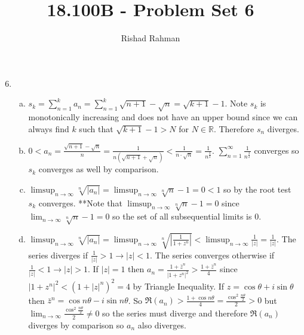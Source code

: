 \documentclass{article}
\begin{document}
\setlength{\abovedisplayskip}{0pt}
\setlength{\belowdisplayskip}{0pt}
\setlength{\abovedisplayshortskip}{0pt}
\setlength{\belowdisplayshortskip}{0pt}
\title{18.100B - Problem Set 6}
\author{Rishad Rahman}
\date{}
\maketitle
\begin{enumerate}
\setcounter{enumi}{5}
\item
\begin{enumerate}[(a)]
\item $s_k=\displaystyle\sum_{n=1}^{k} a_n=\displaystyle\sum_{n=1}^{k} \sqrt{n+1}-\sqrt{n}=\sqrt{k+1}-1$. Note $s_k$ is monotonically increasing and does not have an upper bound since we can always find $k$ such that $\sqrt{k+1}-1 > N$ for $N\in\mathbb{R}$. Therefore $s_n$ diverges.
\item $\displaystyle 0 < a_n=\frac{\sqrt{n+1}-\sqrt{n}}{n}=\frac{1}{n(\sqrt{n+1}+\sqrt{n})} < \frac{1}{n\cdot\sqrt{n}} = \frac{1}{n^{\frac{3}{2}}}$. $\displaystyle\sum_{n=1}^{\infty} \frac{1}{n^{\frac{3}{2}}}$ converges so $s_k$ converges as well by comparison.
\item $\displaystyle\limsup_{n\rightarrow\infty} \sqrt[n]{|a_n|} = \displaystyle\limsup_{n\rightarrow\infty} \sqrt[n]{n} - 1 = 0 < 1$ so by the root test $s_k$ converges. **Note that $\displaystyle\limsup_{n\rightarrow\infty} \sqrt[n]{n} - 1 = 0$ since $\displaystyle\lim_{n\rightarrow\infty} \sqrt[n]{n} - 1 = 0$ so the set of all subsequential limits is ${0}$. 
\item $\displaystyle\limsup_{n\rightarrow\infty} \sqrt[n]{|a_n|}=\displaystyle\limsup_{n\rightarrow\infty} \sqrt[n]{\left|\frac{1}{1+z^n}\right|}<\displaystyle\limsup_{n\rightarrow\infty} \frac{1}{|z|}=\frac{1}{|z|}$. The series diverges if $\displaystyle\frac{1}{|z|}>1\rightarrow |z|<1$. The series converges otherwise if $\displaystyle\frac{1}{|z|}<1\rightarrow |z|>1$. If $|z|=1$ then $a_n=\displaystyle\frac{1+\bar{z}^n}{|1+z^n|^2}>\frac{1+\bar{z}^n}{4}$ since $|1+z^n|^2 < (1+|z|^n)^2 = 4$ by Triangle Inequality. If $z=\cos\theta+i\sin\theta$ then $\bar{z}^n=\cos n\theta - i\sin n\theta$. So  $\displaystyle \Re(a_n)>\frac{1+\cos n\theta}{4}=\frac{\cos^2 \frac{n\theta}{2}}{2}>0$ but $\displaystyle\lim_{n\rightarrow\infty}\frac{\cos^2 \frac{n\theta}{2}}{2} \neq 0$ so the series must diverge and therefore $\Re(a_n)$ diverges by comparison so $a_n$ also diverges.\\
\end{enumerate}

\end{enumerate}
\end{document}
